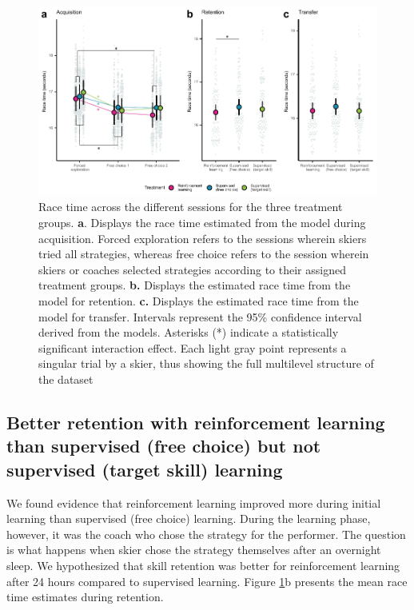\documentclass{article}
\begin{document}
\begin{figure}[H]
\centering
\includegraphics{figures/figure_racingtimes_2.pdf}
\caption{Race time across the different sessions for the three treatment groups. \textbf{a}. Displays the race time estimated from the model during acquisition. Forced exploration refers to the sessions wherein skiers tried all strategies, whereas free choice refers to the session wherein skiers or coaches selected strategies according to their assigned treatment groups. \textbf{b.} Displays the estimated race time from the model for retention. \textbf{c.} Displays the estimated race time from the model for transfer. Intervals represent the 95\% confidence interval derived from the models. Asterisks (*) indicate a statistically significant interaction effect. Each light gray point represents a singular trial by a skier, thus showing the full multilevel structure of the dataset}
\label{fig: racetime}
\end{figure}




\subsection{Better retention with reinforcement learning than supervised (free choice) but not supervised (target skill) learning} \label{result_racetime_retentipon}
We found evidence that reinforcement learning improved more during initial learning than supervised (free choice) learning. During the learning phase, however, it was the coach who chose the strategy for the performer. The question is what happens when skier chose the strategy themselves after an overnight sleep. We hypothesized that skill retention was better for reinforcement learning after 24 hours compared to supervised learning. Figure \ref{fig: racetime}b presents the mean race time estimates during retention.
\end{document}
